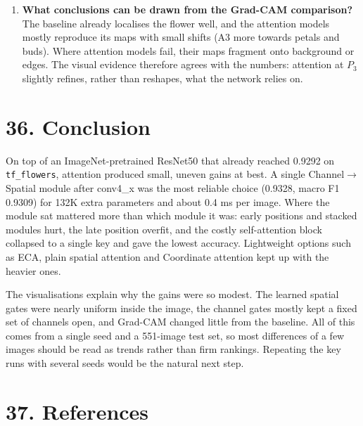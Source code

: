 \documentclass[10pt]{article}
\begin{document}
\begin{enumerate}
\item \textbf{What conclusions can be drawn from the Grad-CAM comparison?}\\
The baseline already localises the flower well, and the attention models
mostly reproduce its maps with small shifts (A3 more towards petals and buds).
Where attention models fail, their maps fragment onto background or edges. The
visual evidence therefore agrees with the numbers: attention at $P_3$ slightly
refines, rather than reshapes, what the network relies on.

\end{enumerate}

\section*{36. Conclusion}

On top of an ImageNet-pretrained ResNet50 that already reached 0.9292 on
\texttt{tf\_flowers}, attention produced small, uneven gains at best. A single
Channel$\rightarrow$Spatial module after conv4\_x was the most reliable choice
(0.9328, macro F1 0.9309) for 132K extra parameters and about 0.4 ms per image.
Where the module sat mattered more than which module it was: early positions and
stacked modules hurt, the late position overfit, and the costly self-attention
block collapsed to a single key and gave the lowest accuracy. Lightweight options
such as ECA, plain spatial attention and Coordinate attention kept up with the
heavier ones.

The visualisations explain why the gains were so modest. The learned spatial gates
were nearly uniform inside the image, the channel gates mostly kept a fixed set of
channels open, and Grad-CAM changed little from the baseline. All of this comes
from a single seed and a 551-image test set, so most differences of a few images
should be read as trends rather than firm rankings. Repeating the key runs with
several seeds would be the natural next step.


\section*{37. References}
\end{document}
